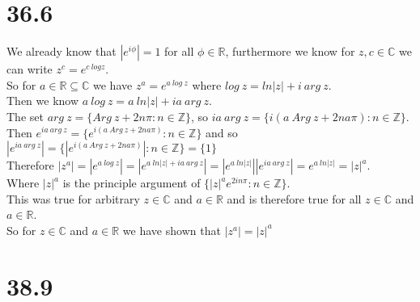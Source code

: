 \documentclass{article}
\begin{document}
\section*{36.6}
\begin{center}
    \doublespacing
    We already know that $|e^{i\phi}| = 1$ for all $\phi\in\mathbb{R}$, furthermore we know for $z, c\in\mathbb{C}$ we can write $z^c = e^{c\:log z}$.
    \\So for $a\in\mathbb{R}\subseteq\mathbb{C}$ we have $z^a = e^{a\:log\:z}$ where $log\:z = ln|z| + i\:arg\:z$.
    \\Then we know $a\:log\:z = a\:ln|z| + ia\:arg\:z$.
    \\The set $arg\:z =\{Arg\:z + 2n\pi:n\in\mathbb{Z}\}$, so $ia\:arg\:z =\{i(a\:Arg\:z + 2na\pi):n\in\mathbb{Z}\}$.
    \\Then $e^{ia\:arg\:z} =\{e^{i(a\:Arg\:z + 2na\pi)}:n\in\mathbb{Z}\}$ and so $|e^{ia\:arg\:z}| =\{|e^{i(a\:Arg\:z + 2na\pi)}|:n\in\mathbb{Z}\} =\{1\}$
    \\Therefore $|z^a| = |e^{a\:log\:z}| = |e^{a\:ln|z| + ia\:arg\:z}| = |e^{a\:ln|z|}||e^{ia\:arg\:z}| = e^{a\:ln|z|} = |z|^a$.
    \\Where $|z|^a$ is the principle argument of $\{|z|^a e^{2in\pi}:n\in\mathbb{Z}\}$.
    \\This was true for arbitrary $z\in\mathbb{C}$ and $a\in\mathbb{R}$ and is therefore true for all $z\in\mathbb{C}$ and $a\in\mathbb{R}$.
    \\So for $z\in\mathbb{C}$ and $a\in\mathbb{R}$ we have shown that $|z^a| = |z|^a$ \qedsymbol
\end{center}


\newpage
\section*{38.9}
\end{document}
